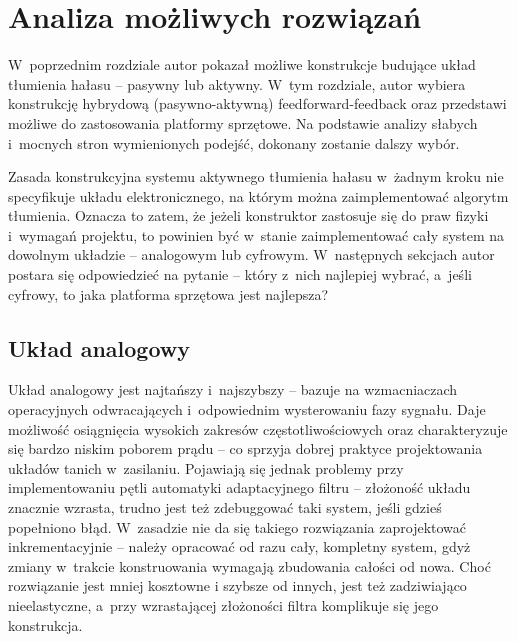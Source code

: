 \chapter{Analiza możliwych rozwiązań}
\label{cha:możliwe_układy}
 W~poprzednim rozdziale autor pokazał możliwe konstrukcje budujące układ tłumienia hałasu -- pasywny lub aktywny. W~tym rozdziale, autor wybiera konstrukcję hybrydową (pasywno-aktywną) feedforward-feedback oraz przedstawi możliwe do zastosowania platformy sprzętowe. Na podstawie analizy słabych i~mocnych stron wymienionych podejść, dokonany zostanie dalszy wybór.

 Zasada konstrukcyjna systemu aktywnego tłumienia hałasu w~żadnym kroku nie specyfikuje układu elektronicznego, na którym można zaimplementować algorytm tłumienia. Oznacza to zatem, że jeżeli konstruktor zastosuje się do praw fizyki i~wymagań projektu, to powinien być w~stanie zaimplementować cały system na dowolnym układzie -- analogowym lub cyfrowym. W~następnych sekcjach autor postara się odpowiedzieć na pytanie -- który z~nich najlepiej wybrać, a~jeśli cyfrowy, to jaka platforma sprzętowa jest najlepsza? 
\section{Układ analogowy}
\label{sec:analog}
Układ analogowy jest najtańszy i~najszybszy -- bazuje na wzmacniaczach operacyjnych odwracających i~odpowiednim wysterowaniu fazy sygnału. Daje możliwość osiągnięcia wysokich zakresów częstotliwościowych oraz charakteryzuje się bardzo niskim poborem prądu -- co sprzyja dobrej praktyce projektowania układów tanich w~zasilaniu. Pojawiają się jednak problemy przy implementowaniu pętli automatyki adaptacyjnego filtru -- złożoność układu znacznie wzrasta, trudno jest też zdebuggować taki system, jeśli gdzieś popełniono błąd. W~zasadzie nie da się takiego rozwiązania zaprojektować inkrementacyjnie -- należy opracować od razu cały, kompletny system, gdyż zmiany w~trakcie konstruowania wymagają zbudowania całości od nowa. Choć rozwiązanie jest mniej kosztowne i szybsze od innych, jest też zadziwiająco nieelastyczne, a~przy wzrastającej złożoności filtra komplikuje się jego konstrukcja.
